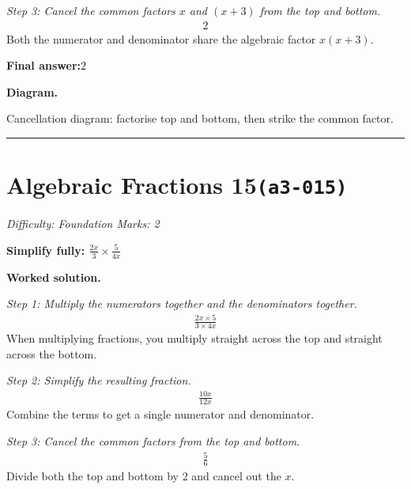 \documentclass[11pt]{article}
\newcommand{\question}[1]{\par\medskip\noindent\textbf{#1}\par}
\begin{document}
\textit{Step 3: Cancel the common factors \( x \) and \( (x + 3) \) from the top and bottom.}
\[\begin{gathered}
2
\end{gathered}\]
Both the numerator and denominator share the algebraic factor \( x(x+3) \).

\begin{answerbox}
\textbf{Final answer:}\quad \(\displaystyle 2\)
\end{answerbox}
\textbf{Diagram.}

\begin{center}
\end{center}
\small Cancellation diagram: factorise top and bottom, then strike the common factor.\normalsize

\medskip\hrule

\section*{Algebraic Fractions 15\quad\small\texttt{(a3-015)}}
\textit{Difficulty: Foundation \quad\textbar\quad Marks: 2}

\question{Simplify fully: \( \frac{2x}{3} \times \frac{5}{4x} \)}

\textbf{Worked solution.}

\textit{Step 1: Multiply the numerators together and the denominators together.}
\[\begin{gathered}
\frac{2x \times 5}{3 \times 4x}
\end{gathered}\]
When multiplying fractions, you multiply straight across the top and straight across the bottom.

\textit{Step 2: Simplify the resulting fraction.}
\[\begin{gathered}
\frac{10x}{12x}
\end{gathered}\]
Combine the terms to get a single numerator and denominator.

\textit{Step 3: Cancel the common factors from the top and bottom.}
\[\begin{gathered}
\frac{5}{6}
\end{gathered}\]
Divide both the top and bottom by 2 and cancel out the \( x \).
\end{document}
